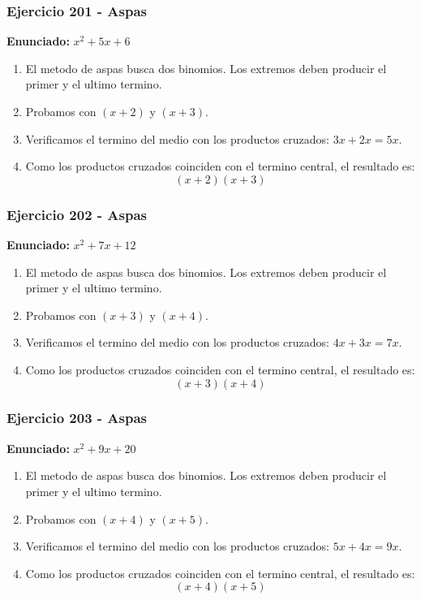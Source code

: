 \documentclass[11pt,a4paper]{article}
\begin{document}
\subsubsection*{Ejercicio 201 - Aspas}
\textbf{Enunciado:} $ x^{2} + 5 x + 6 $\par
\begin{enumerate}[leftmargin=2em]
\item El metodo de aspas busca dos binomios. Los extremos deben producir el primer y el ultimo termino.
\item Probamos con \((x + 2)\) y \((x + 3)\).
\item Verificamos el termino del medio con los productos cruzados: \(3 x+2 x=5 x\).
\item Como los productos cruzados coinciden con el termino central, el resultado es: \[\boxed{\left(x + 2\right)\left(x + 3\right)}\]
\end{enumerate}

\vspace{0.2cm}
\subsubsection*{Ejercicio 202 - Aspas}
\textbf{Enunciado:} $ x^{2} + 7 x + 12 $\par
\begin{enumerate}[leftmargin=2em]
\item El metodo de aspas busca dos binomios. Los extremos deben producir el primer y el ultimo termino.
\item Probamos con \((x + 3)\) y \((x + 4)\).
\item Verificamos el termino del medio con los productos cruzados: \(4 x+3 x=7 x\).
\item Como los productos cruzados coinciden con el termino central, el resultado es: \[\boxed{\left(x + 3\right)\left(x + 4\right)}\]
\end{enumerate}

\vspace{0.2cm}
\subsubsection*{Ejercicio 203 - Aspas}
\textbf{Enunciado:} $ x^{2} + 9 x + 20 $\par
\begin{enumerate}[leftmargin=2em]
\item El metodo de aspas busca dos binomios. Los extremos deben producir el primer y el ultimo termino.
\item Probamos con \((x + 4)\) y \((x + 5)\).
\item Verificamos el termino del medio con los productos cruzados: \(5 x+4 x=9 x\).
\item Como los productos cruzados coinciden con el termino central, el resultado es: \[\boxed{\left(x + 4\right)\left(x + 5\right)}\]
\end{enumerate}
\end{document}
